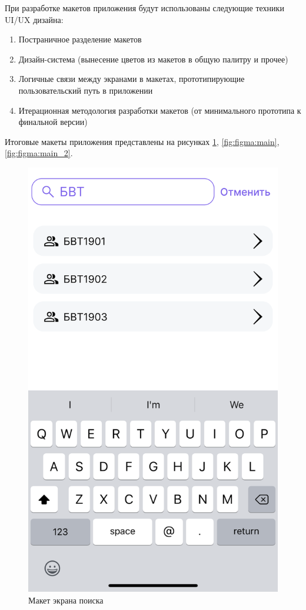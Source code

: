 При разработке макетов приложения будут использованы следующие техники UI/UX дизайна:
\begin{enumerate}
  \item Постраничное разделение макетов
  \item Дизайн-система (вынесение цветов из макетов в общую палитру и прочее)
  \item Логичные связи между экранами в макетах, прототипирующие пользовательский путь в приложении
  \item Итерационная методология разработки макетов (от минимального прототипа к финальной версии)
\end{enumerate}

Итоговые макеты приложения представлены на рисунках 
\ref{fig:figma:search}, \ref{fig:figma:main}, \ref{fig:figma:main_2}.

\begin{figure}
  \centering
  \includegraphics[width=0.8\linewidth]{images/figma/search.png}
  \caption{Макет экрана поиска}
  \label{fig:figma:search}
\end{figure}

